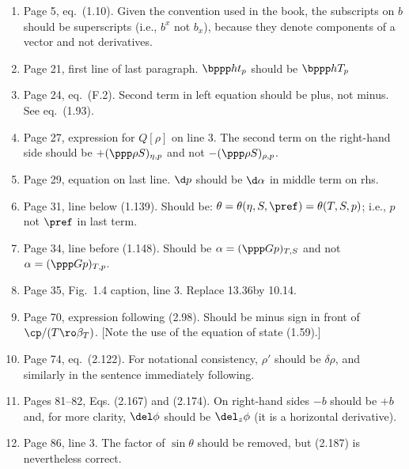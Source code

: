 \documentclass[10pt]{article}
\newcommand{\eq}{eq.\ } \newcommand{\Eq}{Eq.\ }
\begin{document}
\begin{enumerate}

\item Page 5, \eq (1.10).  Given the  convention used in the book, the subscripts on $b$ should be superscripts (i.e., $b^x$ not $b_x$), because they denote components of a vector and not derivatives. 

\item Page 21, first line of last paragraph. $\bppp h t _p$ should be $\bppp hT_p$

\item Page 24, \eq (F.2). Second term in left equation should be plus, not minus. See \eq (1.93).

\item Page 27, expression for $Q[\rho]$ on line 3. The second term on the right-hand side should be $+ (\ppp \rho S)_{\eta,p}$ and not $-(\ppp \rho S)_{\rho,p}$.

\item Page 29, equation on last line. $\d p$ should be $\d \alpha$ in middle term on rhs.

\item Page 31, line below (1.139). Should be: $\theta = \theta(\eta, S, \pref) = \theta (T, S, p)$; i.e., $p$ not $\pref$ in last term.

\item Page 34, line before (1.148). Should be $\alpha  = (\ppp G p)_{T,S}$ and not
$\alpha  = (\ppp G p)_{T,p}$.

\item Page 35, Fig.\ 1.4 caption, line 3. Replace 13.36\dgc by 10.14\dgc. 

\item Page 70, expression following (2.98). Should be minus sign in front of $\cp/(T 
\ro\beta_T)$. [Note the use of the equation of state (1.59).] 

\item Page 74, \eq (2.122). For notational consistency, $\rho'$ should be $\delta \rho$, and similarly in the sentence immediately following.

\item Pages 81--82, Eqs. (2.167) and (2.174). On right-hand sides $-b$ should be $+b$ and, for more clarity, $\del \phi$ should be $\del_z\phi$ (it is a horizontal derivative).

\item Page 86, line 3. The factor of $\sin \theta$ should be removed, but (2.187) is nevertheless correct.


\end{enumerate}
\end{document}

